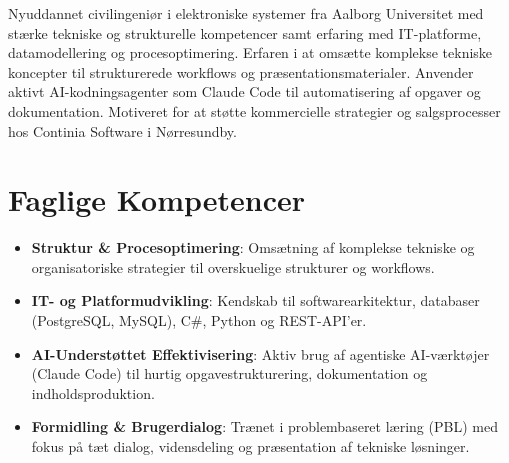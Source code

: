 \documentclass[11pt,a4paper,sans]{moderncv}
\begin{document}
\makecvtitle


\vspace{6pt}
\small{Nyuddannet civilingeniør i elektroniske systemer fra Aalborg Universitet med stærke tekniske og strukturelle kompetencer samt erfaring med IT-platforme, datamodellering og procesoptimering. Erfaren i at omsætte komplekse tekniske koncepter til strukturerede workflows og præsentationsmaterialer. Anvender aktivt AI-kodningsagenter som Claude Code til automatisering af opgaver og dokumentation. Motiveret for at støtte kommercielle strategier og salgsprocesser hos Continia Software i Nørresundby.}


\section{Faglige Kompetencer}
\vspace{1pt}
\begin{itemize}

\item \textbf{Struktur \& Procesoptimering}: Omsætning af komplekse tekniske og organisatoriske strategier til overskuelige strukturer og workflows.

\item \textbf{IT- og Platformudvikling}: Kendskab til softwarearkitektur, databaser (PostgreSQL, MySQL), C\#, Python og REST-API'er.

\item \textbf{AI-Understøttet Effektivisering}: Aktiv brug af agentiske AI-værktøjer (Claude Code) til hurtig opgavestrukturering, dokumentation og indholdsproduktion.

\item \textbf{Formidling \& Brugerdialog}: Trænet i problembaseret læring (PBL) med fokus på tæt dialog, vidensdeling og præsentation af tekniske løsninger.

\end{itemize}

\end{document}
